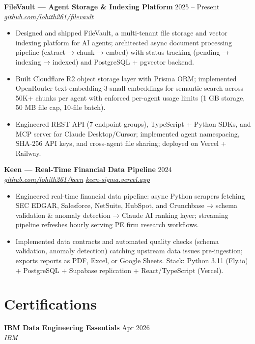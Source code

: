 \documentclass[10pt,letterpaper]{article}
\newcommand{\entry}[3]{%
  \vspace{3pt}\textbf{#1} \hfill #3 \\
  \textit{\small #2}\vspace{1pt}}
\begin{document}
\entry{FileVault --- Agent Storage \& Indexing Platform}{\href{https://github.com/lohith261/filevault}{github.com/lohith261/filevault}}{2025 -- Present}
\begin{itemize}
  \item Designed and shipped FileVault, a multi-tenant file storage and vector indexing platform for AI agents; architected async document processing pipeline (extract → chunk → embed) with status tracking (pending → indexing → indexed) and PostgreSQL + pgvector backend.
  \item Built Cloudflare R2 object storage layer with Prisma ORM; implemented OpenRouter text-embedding-3-small embeddings for semantic search across 50K+ chunks per agent with enforced per-agent usage limits (1 GB storage, 50 MB file cap, 10-file batch).
  \item Engineered REST API (7 endpoint groups), TypeScript + Python SDKs, and MCP server for Claude Desktop/Cursor; implemented agent namespacing, SHA-256 API keys, and cross-agent file sharing; deployed on Vercel + Railway.
\end{itemize}

\entry{Keen --- Real-Time Financial Data Pipeline}{\href{https://github.com/lohith261/keen}{github.com/lohith261/keen} \quad\textbullet\quad \href{https://keen-sigma.vercel.app/}{keen-sigma.vercel.app}}{2024}
\begin{itemize}
  \item Engineered real-time financial data pipeline: async Python scrapers fetching SEC EDGAR, Salesforce, NetSuite, HubSpot, and Crunchbase → schema validation \& anomaly detection → Claude AI ranking layer; streaming pipeline refreshes hourly serving PE firm research workflows.
  \item Implemented data contracts and automated quality checks (schema validation, anomaly detection) catching upstream data issues pre-ingestion; exports reports as PDF, Excel, or Google Sheets. Stack: Python 3.11 (Fly.io) + PostgreSQL + Supabase replication + React/TypeScript (Vercel).
\end{itemize}

\section{Certifications}

\textbf{IBM Data Engineering Essentials} \hfill Apr 2026 \\
\textit{IBM}
\end{document}
